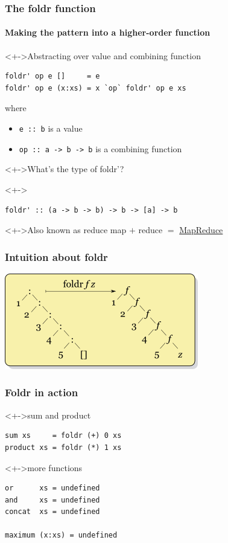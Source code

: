 \documentclass{beamer}
\begin{document}
\begin{frame}[fragile]
  \frametitle{The foldr function}
  \framesubtitle{Making the pattern into a higher-order function}
  \begin{block}<+->{Abstracting over value and combining function}
\begin{verbatim}
foldr' op e []     = e
foldr' op e (x:xs) = x `op` foldr' op e xs
\end{verbatim}
    where
    \begin{itemize}
    \item \texttt{e :: b} is a value
    \item \texttt{op :: a -> b -> b} is a combining function
    \end{itemize}
  \end{block}
  \begin{alertblock}<+->{What's the type of foldr'?}
    \vspace{-\baselineskip}
  \end{alertblock}
  \begin{block}<+->{}
\begin{verbatim}
foldr' :: (a -> b -> b) -> b -> [a] -> b
\end{verbatim}
  \end{block}
  \begin{alertblock}<+->{Also known as reduce}
    map $+$ reduce $=$ \href{https://en.wikipedia.org/wiki/MapReduce}{MapReduce}
  \end{alertblock}
\end{frame}
\begin{frame}
  \frametitle{Intuition about foldr}
  \begin{center}
    \includegraphics{Right-fold-transformation}
  \end{center}
\end{frame}
\begin{frame}[fragile]
  \frametitle{Foldr in action}
  \begin{block}<+->{sum and product}
\begin{verbatim}
sum xs     = foldr (+) 0 xs
product xs = foldr (*) 1 xs
\end{verbatim}
  \end{block}
  \begin{block}<+->{more functions}
\begin{verbatim}
or      xs = undefined
and     xs = undefined
concat  xs = undefined

maximum (x:xs) = undefined
\end{verbatim}
  \end{block}
\end{frame}
\end{document}
